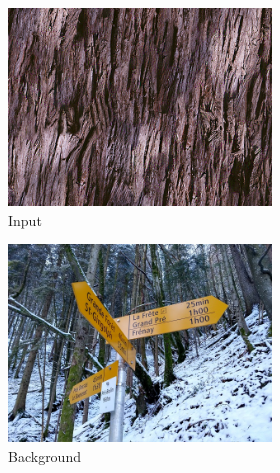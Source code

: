 \begin{figure}[]
    \begin{subfigure}{\textwidth}
        \centering
        \begin{subfigure}{0.24\textwidth}
            \centering
            \includegraphics[width=\textwidth]{images/04-experiment02/photo/wood/target.jpg}
            \caption*{Input}
        \end{subfigure}
        \hfill
        \begin{subfigure}{0.24\textwidth}
            \centering
            \includegraphics[width=\textwidth]{images/04-experiment02/photo/bg.jpg}
            \caption*{Background}
        \end{subfigure}
        \hfill
        \begin{subfigure}{0.24\textwidth}

\end{subfigure}
\end{subfigure}
\end{figure}
